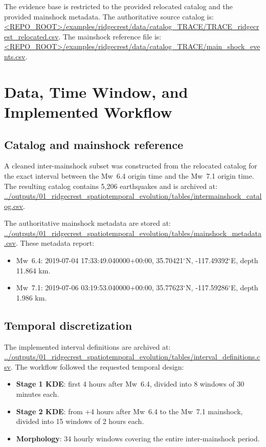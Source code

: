 \documentclass[11pt]{article}
\begin{document}
The evidence base is restricted to the provided relocated catalog and the provided mainshock metadata. The authoritative source catalog is:
\url{<REPO_ROOT>/examples/ridgecrest/data/catalog_TRACE/TRACE_ridgecrest_relocated.csv}.
The mainshock reference file is:
\url{<REPO_ROOT>/examples/ridgecrest/data/catalog_TRACE/main_shock_events.csv}.

\section{Data, Time Window, and Implemented Workflow}
\subsection{Catalog and mainshock reference}
A cleaned inter-mainshock subset was constructed from the relocated catalog for the exact interval between the Mw~6.4 origin time and the Mw~7.1 origin time. The resulting catalog contains 5,206 earthquakes and is archived at:
\url{../outputs/01_ridgecrest_spatiotemporal_evolution/tables/intermainshock_catalog.csv}.

The authoritative mainshock metadata are stored at:
\url{../outputs/01_ridgecrest_spatiotemporal_evolution/tables/mainshock_metadata.csv}.
These metadata report:
\begin{itemize}[leftmargin=2em]
    \item Mw~6.4: 2019-07-04 17:33:49.040000+00:00, 35.70421$^{\circ}$N, -117.49392$^{\circ}$E, depth 11.864 km.
    \item Mw~7.1: 2019-07-06 03:19:53.040000+00:00, 35.77623$^{\circ}$N, -117.59286$^{\circ}$E, depth 1.986 km.
\end{itemize}

\subsection{Temporal discretization}
The implemented interval definitions are archived at:
\url{../outputs/01_ridgecrest_spatiotemporal_evolution/tables/interval_definitions.csv}.
The workflow followed the requested temporal design:
\begin{itemize}[leftmargin=2em]
    \item \textbf{Stage 1 KDE}: first 4 hours after Mw~6.4, divided into 8 windows of 30 minutes each.
    \item \textbf{Stage 2 KDE}: from +4 hours after Mw~6.4 to the Mw~7.1 mainshock, divided into 15 windows of 2 hours each.
    \item \textbf{Morphology}: 34 hourly windows covering the entire inter-mainshock period.
\end{itemize}
\end{document}
